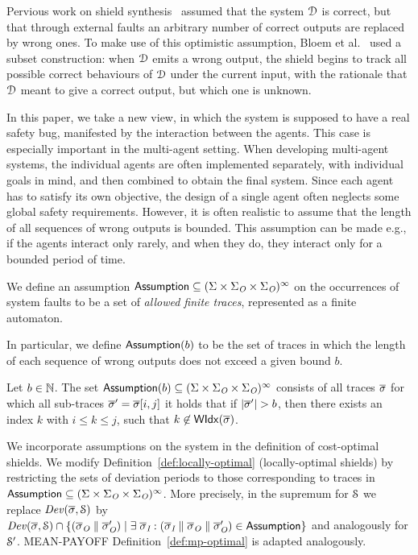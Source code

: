 Pervious work on shield synthesis~\cite{KonighoferABHKT17,BloemKKW15} assumed that the system $\mathcal{D}$ is correct,
but that through external faults an arbitrary number of correct outputs are replaced by wrong ones. To make use of this optimistic assumption, Bloem et al.~\cite{BloemKKW15}
used a subset construction:  when $\mathcal{D}$ emits a wrong output, the shield begins to track all possible correct behaviours of $\mathcal{D}$ under the current input, with the rationale that $\mathcal{D}$ meant to give a correct output, but which one is unknown.

In this paper, we take a new view, in which the system is supposed to have a real safety bug, manifested by the interaction between the agents. This case is especially important in the multi-agent  setting.
When developing multi-agent systems, the individual agents are often implemented separately, with individual goals in mind, and then combined to obtain the final system. Since each agent has to satisfy its own objective, the design of a single agent often neglects some global safety requirements.
However, it is often realistic to assume that the length of all sequences of wrong outputs is bounded. This assumption can be made e.g., if the agents  interact only rarely, and when they do,  they interact only for a bounded period of time.

We define an assumption $\mathsf{Assumption}\subseteq (\Sigma \times \Sigma_{\textit{O}} \times \Sigma_{\textit{O}})^\infty$ on the occurrences of system faults
to be a set of \emph{allowed finite traces}, represented as a finite automaton.

In particular, we define $\mathsf{Assumption}(b)$ to be the set of traces in which the length of each sequence of wrong outputs does not exceed a given bound $b$.
\begin{defn}
Let  $b\in\mathbb{N}$. The set $\mathsf{Assumption}(b)\subseteq (\Sigma \times \Sigma_{\textit{O}} \times \Sigma_{\textit{O}})^\infty$ consists of all traces $\overline\sigma$ for which all sub-traces $\overline\sigma' = \overline\sigma[i,j]$ it holds that if $|\overline\sigma'| > b$, then there exists an index $k$ with $i \leq k \leq j$, such that $k \not \in \mathsf{WIdx}(\overline\sigma)$.
\end{defn}

We incorporate assumptions on the system in the definition of cost-optimal shields.
We modify Definition~\ref{def:locally-optimal} (locally-optimal shields) by restricting the sets of deviation periods to those corresponding to traces in $\mathsf{Assumption} \subseteq (\Sigma \times \Sigma_{\textit{O}} \times \Sigma_{\textit{O}})^\infty$. More precisely, in the supremum  for $\mathcal{S}$ we replace $\mathit{Dev}(\overline\sigma,\mathcal{S})$ by $\mathit{Dev}(\overline\sigma,\mathcal{S}) \cap \{(\overline\sigma_{\textit{O}}\parallel\overline\sigma_{\textit{O}}')\mid \exists\; \overline\sigma_{\textit{I}}: (\overline\sigma_{\textit{I}}\parallel\overline\sigma_{\textit{O}}\parallel\overline\sigma_{\textit{O}}')\in \mathsf{Assumption}\}$ and analogously for $\mathcal{S}'$. 
\iftrue MEAN-PAYOFF
Definition~\ref{def:mp-optimal} is adapted analogously.
\fi

